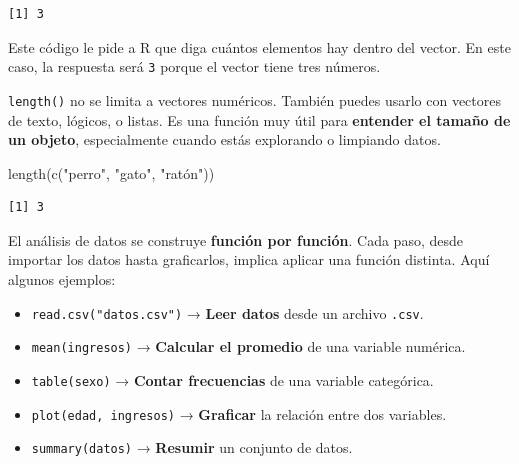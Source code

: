 \documentclass[
  letterpaper,
  DIV=11,
  numbers=noendperiod,
  twoside]{scrreprt}
\newenvironment{Shaded}{\begin{snugshade}}{\end{snugshade}}
\newcommand{\FunctionTok}[1]{\textcolor[rgb]{0.28,0.35,0.67}{#1}}
\newcommand{\NormalTok}[1]{\textcolor[rgb]{0.00,0.23,0.31}{#1}}
\newcommand{\StringTok}[1]{\textcolor[rgb]{0.13,0.47,0.30}{#1}}
\providecommand{\tightlist}{%
  \setlength{\itemsep}{0pt}\setlength{\parskip}{0pt}}\usepackage{longtable,booktabs,array}
\begin{document}
\begin{verbatim}
[1] 3
\end{verbatim}

Este código le pide a R que diga cuántos elementos hay dentro del
vector. En este caso, la respuesta será \texttt{3} porque el vector
tiene tres números.

\texttt{length()} no se limita a vectores numéricos. También puedes
usarlo con vectores de texto, lógicos, o listas. Es una función muy útil
para \textbf{entender el tamaño de un objeto}, especialmente cuando
estás explorando o limpiando datos.

\begin{Shaded}
\begin{Highlighting}[]
\FunctionTok{length}\NormalTok{(}\FunctionTok{c}\NormalTok{(}\StringTok{"perro"}\NormalTok{, }\StringTok{"gato"}\NormalTok{, }\StringTok{"ratón"}\NormalTok{))}
\end{Highlighting}
\end{Shaded}

\begin{verbatim}
[1] 3
\end{verbatim}

\begin{tcolorbox}[enhanced jigsaw, titlerule=0mm, title=\textcolor{quarto-callout-tip-color}{\faLightbulb}\hspace{0.5em}{A tomar en cuenta}, colback=white, opacityback=0, breakable, toprule=.15mm, left=2mm, leftrule=.75mm, colframe=quarto-callout-tip-color-frame, bottomtitle=1mm, rightrule=.15mm, opacitybacktitle=0.6, coltitle=black, arc=.35mm, bottomrule=.15mm, toptitle=1mm, colbacktitle=quarto-callout-tip-color!10!white]

El análisis de datos se construye \textbf{función por función}. Cada
paso, desde importar los datos hasta graficarlos, implica aplicar una
función distinta. Aquí algunos ejemplos:

\begin{itemize}
\tightlist
\item
  \texttt{read.csv("datos.csv")} → \textbf{Leer datos} desde un archivo
  \texttt{.csv}.
\item
  \texttt{mean(ingresos)} → \textbf{Calcular el promedio} de una
  variable numérica.
\item
  \texttt{table(sexo)} → \textbf{Contar frecuencias} de una variable
  categórica.
\item
  \texttt{plot(edad,\ ingresos)} → \textbf{Graficar} la relación entre
  dos variables.
\item
  \texttt{summary(datos)} → \textbf{Resumir} un conjunto de datos.
\end{itemize}

\end{tcolorbox}
\end{document}
